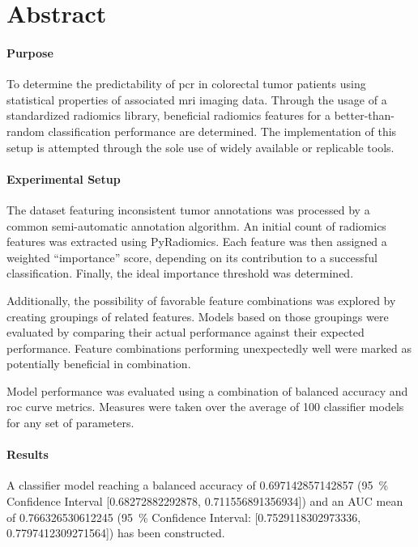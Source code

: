 \section*{Abstract}

\paragraph{Purpose} To determine the predictability of \acs{pcr} in colorectal
tumor patients using statistical properties of associated \acs{mri} imaging data.
Through the usage of a standardized radiomics library, beneficial radiomics 
features for a better-than-random classification performance are determined. 
The implementation of this setup is attempted through the sole use
of widely available or replicable tools.

\paragraph{Experimental Setup} The dataset featuring inconsistent tumor annotations
was processed by a common semi-automatic annotation algorithm. An initial count 
of \featureCount{} radiomics features was extracted using PyRadiomics. Each 
feature was then assigned a weighted \enquote{importance} score, depending on 
its contribution to a successful classification. Finally, the ideal importance 
threshold was determined.

Additionally, the possibility of favorable feature combinations was explored by
creating groupings of related features. Models based on those groupings were
evaluated by comparing their actual performance against their expected 
performance. Feature combinations performing unexpectedly well were marked as 
potentially beneficial in combination.

Model performance was evaluated using a combination of balanced accuracy and 
\acs{roc} curve metrics. Measures were taken over the average of 100 classifier
models for any set of parameters.

\paragraph{Results} A classifier model reaching a balanced
accuracy of \num{0.697142857142857} (\SI{95}{\percent} Confidence Interval 
[\num{0.68272882292878}, \num{0.711556891356934}]) and an AUC mean of 
\num{0.766326530612245} (\SI{95}{\percent} Confidence Interval:
[\num{0.7529118302973336}, \num{0.7797412309271564}]) has been constructed.

